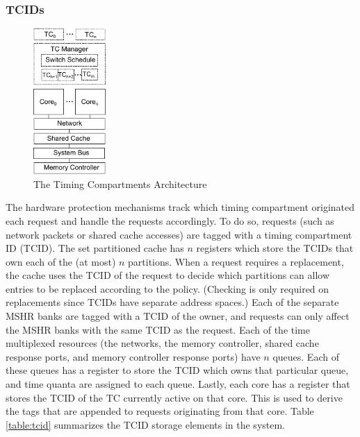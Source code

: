 \subsubsection{TCIDs}
\begin{figure}
    \begin{center}
        \includegraphics[width=1.08in]{figs/hw_sw_arch.pdf}
        \caption{The Timing Compartments Architecture}
        \label{fig:arch}
    \end{center}
\end{figure}

The hardware protection mechanisms track which timing compartment originated 
each request and handle the requests accordingly. To do so, requests (such as 
network packets or shared cache accesses) are tagged with a timing compartment 
ID (TCID). The set partitioned cache has $n$ registers which store the TCIDs
that own each of the (at most) $n$ partitions. When a request requires a 
replacement, the cache uses the TCID of the request to decide which partitions 
can allow entries to be replaced according to the policy. (Checking is only 
required on replacements since TCIDs have separate address spaces.) Each of the 
separate MSHR banks are tagged with a TCID of the owner, and requests can only 
affect the MSHR banks with the same TCID as the request. Each of the time 
multiplexed resources (the networks, the memory controller, shared cache 
response ports, and memory controller response ports) have $n$ queues. Each of 
these queues has a register to store the TCID which owns that particular queue, 
and time quanta are assigned to each queue. Lastly, each core has a register 
that stores the TCID of the TC currently active on that core. This is used to 
derive the tags that are appended to requests originating from that core. Table 
\ref{table:tcid} summarizes the TCID storage elements in the system.

